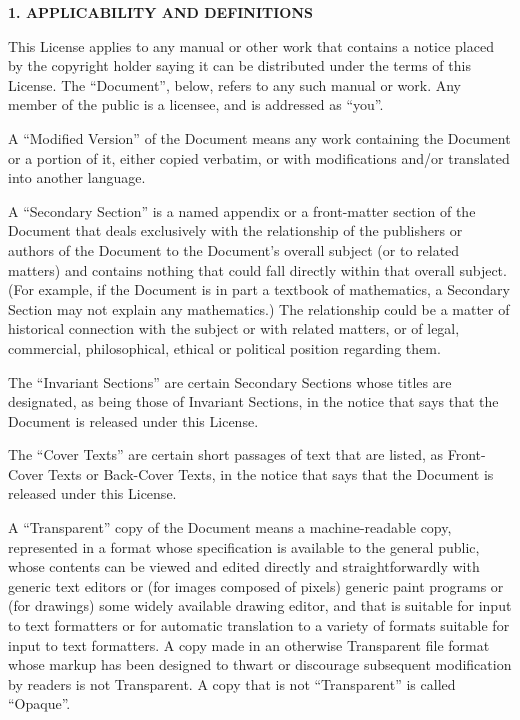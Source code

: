 \begin{center}
{\Large\bf 1. APPLICABILITY AND DEFINITIONS\par}
\end{center}

This License applies to any manual or other work that contains a
notice placed by the copyright holder saying it can be distributed
under the terms of this License.  The ``Document'', below, refers to any
such manual or work.  Any member of the public is a licensee, and is
addressed as ``you''.

A ``Modified Version'' of the Document means any work containing the
Document or a portion of it, either copied verbatim, or with
modifications and/or translated into another language.

A ``Secondary Section'' is a named appendix or a front-matter section of
the Document that deals exclusively with the relationship of the
publishers or authors of the Document to the Document's overall subject
(or to related matters) and contains nothing that could fall directly
within that overall subject.  (For example, if the Document is in part a
textbook of mathematics, a Secondary Section may not explain any
mathematics.)  The relationship could be a matter of historical
connection with the subject or with related matters, or of legal,
commercial, philosophical, ethical or political position regarding
them.

The ``Invariant Sections'' are certain Secondary Sections whose titles
are designated, as being those of Invariant Sections, in the notice
that says that the Document is released under this License.

The ``Cover Texts'' are certain short passages of text that are listed,
as Front-Cover Texts or Back-Cover Texts, in the notice that says that
the Document is released under this License.

A ``Transparent'' copy of the Document means a machine-readable copy,
represented in a format whose specification is available to the
general public, whose contents can be viewed and edited directly and
straightforwardly with generic text editors or (for images composed of
pixels) generic paint programs or (for drawings) some widely available
drawing editor, and that is suitable for input to text formatters or
for automatic translation to a variety of formats suitable for input
to text formatters.  A copy made in an otherwise Transparent file
format whose markup has been designed to thwart or discourage
subsequent modification by readers is not Transparent.  A copy that is
not ``Transparent'' is called ``Opaque''.

